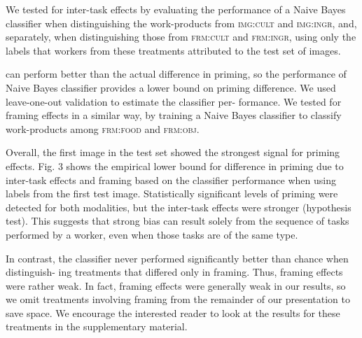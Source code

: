 \documentclass[12pt]{article}
\begin{document}
We tested for inter-task effects by evaluating the performance of a Naive 
Bayes classifier when distinguishing the work-products from 
\textsc{img:cult} and \textsc{img:ingr}, and, separately, when distinguishing
those from \textsc{frm:cult} and \textsc{frm:ingr},
using only the labels that workers from these treatments
attributed to the test set of images.

can perform better than the actual difference in priming, so the performance 
of Naive Bayes classifier provides a lower bound on priming difference. We 
used leave-one-out validation to estimate the classifier per- formance. We 
tested for framing effects in a similar way, by training a Naive Bayes 
classifier to classify work-products among \textsc{frm:food} and 
\textsc{frm:obj}.

Overall, the first image in the test set showed the strongest signal for 
priming effects. Fig. 3 shows the empirical lower bound for difference in 
priming due to inter-task effects and framing based on the classifier 
performance when using labels from the first test image. Statistically 
significant levels of priming were detected for both modalities, but the 
inter-task effects were stronger (hypothesis test). This suggests that strong 
bias can result solely from the sequence of tasks performed by a worker, even 
when those tasks are of the same type.

In contrast, the classifier never performed significantly better than chance 
when distinguish- ing treatments that differed only in framing. Thus, framing 
effects were rather weak. In fact, framing effects were generally weak in our 
results, so we omit treatments involving framing from the remainder of our 
presentation to save space. We encourage the interested reader to look at the 
results for these treatments in the supplementary material.

%
\end{document}
